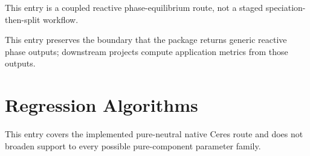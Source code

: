 \documentclass[12pt, letterpaper]{article}
\begin{document}
This entry is a coupled reactive phase-equilibrium route, not a staged
speciation-then-split workflow.


This entry preserves the boundary that the package returns generic reactive
phase outputs; downstream projects compute application metrics from those
outputs.

\section{Regression Algorithms}


This entry covers the implemented pure-neutral native Ceres route and does not
broaden support to every possible pure-component parameter family.

\end{document}
